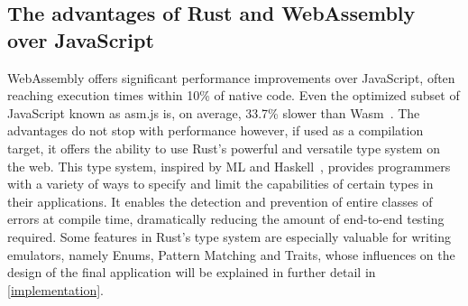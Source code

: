 \subsection{The advantages of Rust and WebAssembly over JavaScript}
WebAssembly offers significant performance improvements over JavaScript, often reaching execution times within 10\% of native code. Even the optimized subset of JavaScript known as asm.js is, on average, 33.7\% slower than Wasm~\cite[Chapter~7.3]{wasmspeed}. The advantages do not stop with performance however, if used as a compilation target, it offers the ability to use Rust's powerful and versatile type system on the web.
This type system, inspired by ML and Haskell~\cite{rustinfluences}, provides programmers with a variety of ways to specify and limit the capabilities of certain types in their applications.
It enables the detection and prevention of entire classes of errors at compile time, dramatically reducing the amount of end-to-end testing required.
Some features in Rust's type system are especially valuable for writing emulators, namely Enums, Pattern Matching and Traits, whose influences on the design of the final application will be explained in further detail in \cref{implementation}.


